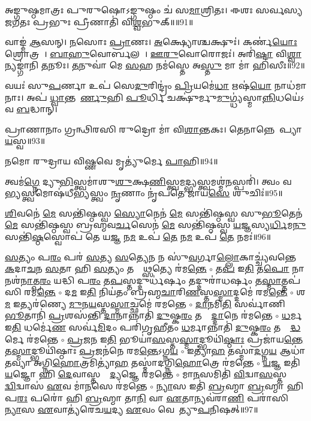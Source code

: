 𑌅𑌙𑍍𑌗𑍁𑌷𑍍𑌠𑌮𑌾𑌤𑍍𑌰𑌃 𑌪𑍁𑌰𑍁𑌷𑍋𑌽𑌙𑍍𑌗𑍁𑌷𑍍𑌠𑌂 𑌚॑ 𑌸\ul{𑌮𑌾}𑌶𑍍𑌰𑌿𑌤𑌃। 
𑌈𑌶𑌃 𑌸𑌰𑍍𑌵𑌸𑍍𑌯 𑌜𑌗𑌤𑌃 𑌪𑍍𑌰𑌭𑍁𑌃 𑌪𑍍𑌰𑍀𑌣𑌾𑌤𑌿॑ 𑌵𑌿\ul{𑌶𑍍𑌵}𑌭𑍁𑌕𑍍॥॥91॥\anuvakamend

𑌵𑌾𑌙𑍍𑌮॑ \ul{𑌆}𑌸𑌨𑍍। 
\ul{𑌨}𑌸𑍋𑌃 \ul{𑌪𑍍𑌰𑌾}𑌣𑌃। 
\ul{𑌅}𑌕𑍍𑌷𑍍𑌯𑍋𑌶𑍍𑌚𑌕𑍍𑌷𑍁𑌃॑। 
𑌕𑌰𑍍𑌣॑\ul{𑌯𑍋𑌃} 𑌶𑍍𑌰𑍋𑌤𑍍𑌰𑌮𑍍᳚। 
\ul{𑌬𑌾}\ul{𑌹𑍁}𑌵𑍋𑌰𑍍𑌬𑌲𑌮𑍍᳚। 
\ul{𑌊}\ul{𑌰𑍁}𑌵𑍋𑌰𑍋𑌜𑌃॑। 
𑌅𑌰𑌿॑\ul{𑌷𑍍𑌟𑌾} 𑌵𑌿\ul{𑌶𑍍𑌵𑌾}𑌨𑍍𑌯𑌙𑍍𑌗𑌾॑𑌨𑌿 \ul{𑌤}𑌨𑍂𑌃। 
\ul{𑌤}𑌨𑍁𑌵𑌾॑ 𑌮𑍇 \ul{𑌸}𑌹 𑌨𑌮॑𑌸𑍍𑌤𑍇 𑌅\ul{𑌸𑍍𑌤𑍁} 𑌮𑌾 𑌮𑌾॑ 𑌹𑌿𑌸𑍀𑌃॥92॥\anuvakamend

𑌵𑌯𑌃॑ 𑌸𑍁\ul{𑌪}𑌰𑍍𑌣𑌾 𑌉𑌪॑ 𑌸𑍇\ul{𑌦𑍁}𑌰𑌿𑌨𑍍𑌦𑍍𑌰𑌂॑ \ul{𑌪𑍍𑌰𑌿}𑌯𑌮𑍇॑\ul{𑌧𑌾} 𑌋𑌷॑\ul{𑌯𑍋} 𑌨𑌾𑌧॑𑌮𑌾𑌨𑌾𑌃। 
𑌅𑌪॑ \ul{𑌧𑍍𑌵𑌾}𑌨𑍍𑌤𑌮𑍂᳚\ul{𑌰𑍍𑌣𑍁}𑌹𑌿 \ul{𑌪𑍂}𑌰𑍍𑌧𑌿 𑌚𑌕𑍍𑌷𑍁॑𑌰𑍍𑌮𑍁\ul{𑌮𑍁}𑌗𑍍𑌧𑍍𑌯॑𑌸𑍍𑌮𑌾\ul{𑌨𑍍𑌨𑌿}𑌧𑌯𑍇॑𑌽𑌵 \ul{𑌬}𑌦𑍍𑌧𑌾𑌨𑍍।\anuvakamend

𑌪𑍍𑌰𑌾𑌣𑌾𑌨𑌾𑌂 𑌗𑍍𑌰𑌨𑍍𑌥𑌿𑌰𑌸𑌿 𑌰𑍁𑌦𑍍𑌰𑍋 𑌮𑌾॑ 𑌵𑌿\ul{𑌶𑌾}𑌨𑍍𑌤𑌕𑌃। 
𑌤𑍇𑌨𑌾𑌨𑍍𑌨𑍇𑌨𑌾᳚𑌪𑍍𑌯𑌾\-\ul{𑌯}𑌸𑍍𑌵॥93॥\anuvakamend

𑌨𑌮𑍋 𑌰𑍁𑌦𑍍𑌰𑌾𑌯 𑌵𑌿𑌷𑍍𑌣𑌵𑍇 𑌮𑍃𑌤𑍍𑌯𑍁॑𑌰𑍍𑌮𑍇 \ul{𑌪𑌾}𑌹𑌿॥94॥\anuvakamend


𑌤𑍍𑌵𑌮॑\ul{𑌗𑍍𑌨𑍇} 𑌦𑍍𑌯𑍁\ul{𑌭𑌿}𑌸𑍍𑌤𑍍𑌵𑌮𑌾॑𑌶𑍁\ul{𑌶𑍁}𑌕𑍍𑌷\ul{𑌣𑌿}𑌸𑍍𑌤𑍍𑌵\ul{𑌮}𑌦𑍍𑌭𑍍𑌯𑌸𑍍𑌤𑍍𑌵𑌮𑌶𑍍𑌮॑\ul{𑌨}𑌸𑍍𑌪𑌰𑌿॑। 
𑌤𑍍𑌵𑌂 𑌵𑌨𑍇᳚\ul{𑌭𑍍𑌯}𑌸𑍍𑌤𑍍𑌵𑌮𑍋𑌷॑𑌧𑍀\ul{𑌭𑍍𑌯}𑌸𑍍𑌤𑍍𑌵𑌂 \ul{𑌨𑍃}𑌣𑌾𑌂 𑌨𑍃॑𑌪𑌤𑍇 𑌜𑌾𑌯\ul{𑌸𑍇} 𑌶𑍁𑌚𑌿𑌃॑॥95॥\anuvakamend

\ul{𑌶𑌿}𑌵𑌨𑍇॑ \ul{𑌮𑍇} 𑌸𑌨𑍍𑌤𑌿॑𑌷𑍍𑌠𑌸𑍍𑌵 \ul{𑌸𑍍𑌯𑍋}𑌨𑍇𑌨॑  \ul{𑌮𑍇} 𑌸𑌨𑍍𑌤𑌿॑𑌷𑍍𑌠𑌸𑍍𑌵 𑌸𑍁\ul{𑌭𑍂}𑌤𑍇𑌨॑  \ul{𑌮𑍇} 𑌸𑌨𑍍𑌤𑌿॑𑌷𑍍𑌠𑌸𑍍𑌵 𑌬𑍍𑌰𑌹𑍍𑌮𑌵\ul{𑌰𑍍𑌚}𑌸𑍇𑌨॑  \ul{𑌮𑍇} 𑌸𑌨𑍍𑌤𑌿॑𑌷𑍍𑌠𑌸𑍍𑌵 \ul{𑌯}𑌜𑍍𑌞𑌸𑍍𑌯\ul{𑌰𑍍𑌧𑌿}𑌮\ul{𑌨𑍁} 𑌸𑌨𑍍𑌤𑌿॑\ul{𑌷𑍍𑌠}𑌸𑍍𑌵𑍋𑌪॑ 𑌤𑍇 𑌯\ul{𑌜𑍍𑌞} 𑌨\ul{𑌮} 𑌉𑌪॑ \ul{𑌤𑍇} 𑌨\ul{𑌮} 𑌉𑌪॑ \ul{𑌤𑍇} 𑌨𑌮𑌃॑॥96॥\anuvakamend

\newcommand{\sep}{{\small$\circ$} }
\ul{𑌸}𑌤𑍍𑌯𑌂 𑌪\ul{𑌰𑌂} 𑌪𑌰॑ \ul{𑌸}𑌤𑍍𑌯 \ul{𑌸}𑌤𑍍𑌯𑍇\ul{𑌨} 𑌨 𑌸𑍁॑\ul{𑌵}𑌰𑍍𑌗𑌾\ul{𑌲𑍍𑌲𑍋}𑌕𑌾𑌚𑍍𑌚𑍍𑌯॑𑌵𑌨𑍍𑌤𑍇 \ul{𑌕}𑌦𑌾\ul{𑌚}𑌨 \ul{𑌸}𑌤𑌾 𑌹𑌿 \ul{𑌸}𑌤𑍍𑌯𑌂 𑌤𑌸𑍍𑌮𑌾᳚\ul{𑌥𑍍𑌸}𑌤𑍍𑌯𑍇 𑌰॑𑌮\ul{𑌨𑍍𑌤𑍇} \sep
𑌤\ul{𑌪} 𑌇\ul{𑌤𑌿} 𑌤\ul{𑌪𑍋} 𑌨𑌾𑌨𑌶॑\ul{𑌨𑌾}𑌤𑍍𑌪\ul{𑌰𑌂} 𑌯𑌦𑍍𑌧𑌿 𑌪\ul{𑌰𑌂} 𑌤\ul{𑌪}𑌸𑍍𑌤𑌦𑍍𑌦𑍁𑌰𑍍𑌧॑𑌰𑍍\mbox{}\ul{𑌷𑌂} 𑌤𑌦𑍍𑌦𑍁𑌰𑌾॑𑌧𑌰𑍍\mbox{}\ul{𑌷𑌂} 𑌤\ul{𑌸𑍍𑌮𑌾}𑌤𑍍𑌤𑌪॑𑌸𑌿 𑌰𑌮\ul{𑌨𑍍𑌤𑍇} \sep
𑌦\ul{𑌮} 𑌇\ul{𑌤𑌿} 𑌨𑌿𑌯॑𑌤𑌂 𑌬𑍍𑌰𑌹𑍍𑌮\ul{𑌚𑌾}𑌰𑌿\ul{𑌣}𑌸𑍍𑌤\ul{𑌸𑍍𑌮𑌾}𑌦𑍍𑌦𑌮𑍇॑ 𑌰𑌮\ul{𑌨𑍍𑌤𑍇} \sep
𑌶\ul{𑌮} 𑌇𑌤𑍍𑌯𑌰॑𑌣𑍍𑌯𑍇 \ul{𑌮𑍁}𑌨\ul{𑌯}𑌸𑍍𑌤\ul{𑌸𑍍𑌮𑌾}𑌚𑍍𑌛𑌮𑍇॑ 𑌰𑌮𑌨𑍍𑌤𑍇 \sep
\ul{𑌦𑌾}𑌨𑌮𑌿\ul{𑌤𑌿} 𑌸𑌰𑍍𑌵𑌾॑𑌣𑌿 \ul{𑌭𑍂}𑌤𑌾𑌨𑌿॑ \ul{𑌪𑍍𑌰}𑌶𑌸॑𑌨𑍍𑌤𑌿 \ul{𑌦𑌾}𑌨𑌾𑌨𑍍𑌨𑌾𑌤𑌿॑ \ul{𑌦𑍁}𑌷𑍍𑌕\ul{𑌰𑌂} 𑌤𑌸𑍍𑌮𑌾᳚\ul{𑌦𑍍𑌦𑌾}𑌨𑍇 𑌰॑𑌮𑌨𑍍𑌤𑍇 \sep
\ul{𑌧}𑌰𑍍𑌮 𑌇\ul{𑌤𑌿} 𑌧𑌰𑍍𑌮𑍇॑\ul{𑌣} 𑌸𑌰𑍍𑌵॑\ul{𑌮𑌿}𑌦𑌂 𑌪𑌰𑌿॑𑌗𑍃𑌹𑍀𑌤𑌂 \ul{𑌧}𑌰𑍍𑌮𑌾𑌨𑍍𑌨𑌾𑌤𑌿॑ \ul{𑌦𑍁}𑌷𑍍𑌕\ul{𑌰𑌂} 𑌤𑌸𑍍𑌮𑌾᳚\ul{𑌦𑍍𑌧}𑌰𑍍𑌮𑍇 𑌰॑𑌮𑌨𑍍𑌤𑍇 \sep
\ul{𑌪𑍍𑌰}𑌜\ul{𑌨} 𑌇\ul{𑌤𑌿} 𑌭𑍂𑌯𑌾॑\ul{𑌸}𑌸𑍍𑌤\ul{𑌸𑍍𑌮𑌾}𑌦𑍍𑌭𑍂𑌯𑌿॑\ul{𑌷𑍍𑌠𑌾𑌃} 𑌪𑍍𑌰𑌜𑌾॑𑌯\ul{𑌨𑍍𑌤𑍇} 𑌤\ul{𑌸𑍍𑌮𑌾}𑌦𑍍𑌭𑍂𑌯𑌿॑𑌷𑍍𑌠𑌾𑌃 \ul{𑌪𑍍𑌰}𑌜𑌨॑𑌨𑍇 𑌰𑌮\ul{𑌨𑍍𑌤𑍇}𑌽𑌗𑍍𑌨\ul{𑌯} \sep
𑌇𑌤𑍍𑌯𑌾॑\ul{𑌹} 𑌤𑌸𑍍𑌮𑌾॑\ul{𑌦}𑌗𑍍𑌨\ul{𑌯} 𑌆𑌧𑌾॑𑌤𑌵𑍍𑌯𑌾 𑌅𑌗𑍍𑌨𑌿\ul{𑌹𑍋}𑌤𑍍𑌰𑌮𑌿𑌤𑍍𑌯𑌾॑\ul{𑌹} 𑌤𑌸𑍍𑌮𑌾॑𑌦𑌗𑍍𑌨𑌿\ul{𑌹𑍋}𑌤𑍍𑌰𑍇 𑌰॑𑌮𑌨𑍍𑌤𑍇 \sep
\ul{𑌯}𑌜𑍍𑌞 𑌇𑌤𑌿॑ \ul{𑌯}𑌜𑍍𑌞𑍋 𑌹𑌿 \ul{𑌦𑍇}𑌵𑌾𑌸𑍍𑌤𑌸𑍍𑌮𑌾᳚\ul{𑌦𑍍𑌯}𑌜𑍍𑌞𑍇 𑌰॑𑌮𑌨𑍍𑌤𑍇 \sep
𑌮𑌾\ul{𑌨}𑌸𑌮𑌿𑌤𑌿॑ \ul{𑌵𑌿}𑌦𑍍𑌵𑌾\ul{𑌸}𑌸𑍍𑌤𑌸𑍍𑌮𑌾᳚\ul{𑌦𑍍𑌵𑌿}𑌦𑍍𑌵𑌾𑌸॑ \ul{𑌏}𑌵 𑌮𑌾॑\ul{𑌨}𑌸𑍇 𑌰॑𑌮𑌨𑍍𑌤𑍇 \sep
\ul{𑌨𑍍𑌯𑌾}𑌸 𑌇𑌤𑌿॑ \ul{𑌬𑍍𑌰}𑌹𑍍𑌮𑌾 \ul{𑌬𑍍𑌰}𑌹𑍍𑌮𑌾 𑌹𑌿 𑌪\ul{𑌰𑌃} 𑌪𑌰𑍋॑ 𑌹𑌿 \ul{𑌬𑍍𑌰}𑌹𑍍𑌮𑌾 𑌤𑌾\ul{𑌨𑌿} 𑌵𑌾 \ul{𑌏}𑌤𑌾𑌨𑍍𑌯𑌵॑𑌰𑌾\ul{𑌣𑌿} 𑌪𑌰𑌾॑𑌸𑌿 \ul{𑌨𑍍𑌯𑌾}𑌸 \ul{𑌏}𑌵𑌾𑌤𑍍𑌯॑𑌰𑍇𑌚\ul{𑌯}𑌦𑍍𑌯 \ul{𑌏}𑌵𑌂 𑌵𑍇𑌦𑍇᳚𑌤𑍍𑌯𑍁\ul{𑌪}𑌨𑌿𑌷𑌤𑍍॥97॥
\anuvakamend


